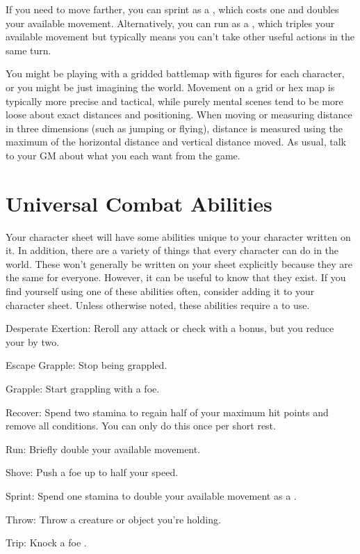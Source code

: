   If you need to move farther, you can sprint as a , which costs one  and doubles your available movement.
  Alternatively, you can run as a , which triples your available movement but typically means you can't take other useful actions in the same turn.

  You might be playing with a gridded battlemap with figures for each character, or you might be just imagining the world.
  Movement on a grid or hex map is typically more precise and tactical, while purely mental scenes tend to be more loose about exact distances and positioning.
  When moving or measuring distance in three dimensions (such as jumping or flying), distance is measured using the maximum of the horizontal distance and vertical distance moved.
  As usual, talk to your GM about what you each want from the game.

\section{Universal Combat Abilities}
  Your character sheet will have some abilities unique to your character written on it.
  In addition, there are a variety of things that every character can do in the world.
  These won't generally be written on your sheet explicitly because they are the same for everyone.
  However, it can be useful to know that they exist.
  If you find yourself using one of these abilities often, consider adding it to your character sheet.
  Unless otherwise noted, these abilities require a  to use.

  \begin{raggeditemize}
    \item Desperate Exertion: Reroll any attack or check with a  bonus, but you reduce your  by two.
    \item Escape Grapple: Stop being grappled.
    \item Grapple: Start grappling with a foe.
    \item Recover: Spend two stamina to regain half of your maximum hit points and remove all conditions. You can only do this once per short rest.
    \item Run: Briefly double your available movement.
    \item Shove: Push a foe up to half your speed.
    \item Sprint: Spend one stamina to double your available movement as a .
    \item Throw: Throw a creature or object you're holding.
    \item Trip: Knock a foe \prone.
  \end{raggeditemize}

